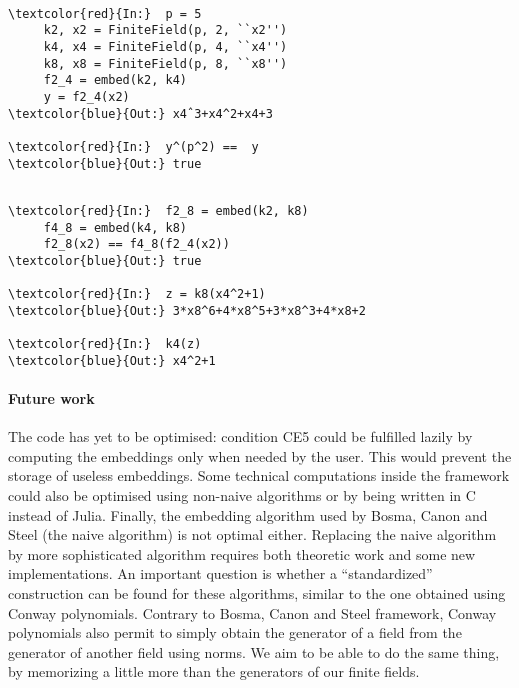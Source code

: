 \documentclass[12pt]{article}
\begin{document}
\begin{minipage}{0.45\textwidth}
  \begin{Verbatim}[commandchars=\\\{\}]

\textcolor{red}{In:}  p = 5
     k2, x2 = FiniteField(p, 2, ``x2'')
     k4, x4 = FiniteField(p, 4, ``x4'')
     k8, x8 = FiniteField(p, 8, ``x8'')
     f2_4 = embed(k2, k4)
     y = f2_4(x2)
\textcolor{blue}{Out:} x4ˆ3+x4^2+x4+3 

\textcolor{red}{In:}  y^(p^2) ==  y
\textcolor{blue}{Out:} true 
  \end{Verbatim}
\end{minipage}
\hfill
\begin{minipage}{0.45\textwidth}
  \begin{Verbatim}[commandchars=\\\{\}]

\textcolor{red}{In:}  f2_8 = embed(k2, k8)
     f4_8 = embed(k4, k8)
     f2_8(x2) == f4_8(f2_4(x2))
\textcolor{blue}{Out:} true

\textcolor{red}{In:}  z = k8(x4^2+1)
\textcolor{blue}{Out:} 3*x8^6+4*x8^5+3*x8^3+4*x8+2

\textcolor{red}{In:}  k4(z)
\textcolor{blue}{Out:} x4^2+1
  \end{Verbatim}
\end{minipage}

\paragraph{Future work}

The code has yet to be optimised: condition CE5 could be fulfilled lazily by
computing the embeddings only when needed by the user. This would prevent the
storage of useless embeddings. Some technical computations inside the framework could also be optimised
using non-naive algorithms or by being written in C instead of Julia. Finally,
the embedding algorithm used by Bosma,
Canon and Steel (the naive algorithm) is not optimal either. Replacing the naive
algorithm by more sophisticated algorithm requires both theoretic work and some
new implementations. An important question is whether a ``standardized''
construction can be found for these algorithms, similar to the one obtained
using Conway polynomials. Contrary to Bosma, Canon and Steel framework, Conway
polynomials also permit to simply obtain the generator of a field from the
generator of another field using norms. We aim to be able to do the same thing,
by memorizing a little more than the generators of our finite fields.



\end{document}
